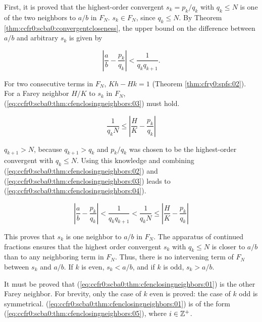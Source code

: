 \begin{vworktheoremproof}
First, it is proved that the highest-order
convergent $s_k = p_k/q_k$ with $q_k \leq N$ is one of the two
neighbors to $a/b$ in $F_N$.  $s_k \in F_N$, since $q_k \leq N$.
By Theorem \ref{thm:ccfr0:scba0:convergentcloseness}, the upper bound on the
difference between $a/b$ and arbitrary $s_k$ is given by

\begin{equation}
\label{eq:ccfr0:scba0:thm:cfenclosingneighbors:02}
\left| {\frac{a}{b}  - \frac{{p_k }}{{q_k }}} \right| < \frac{1}{{q_k q_{k + 1} }}.
\end{equation}

For two consecutive terms in $F_N$, $Kh-Hk=1$ 
(\cfryzeroxrefcomma{}Theorem \ref{thm:cfry0:spfs:02}).
For a Farey neighbor $H/K$ to $s_k$ in $F_N$, 
(\ref{eq:ccfr0:scba0:thm:cfenclosingneighbors:03}) must hold.

\begin{equation}
\label{eq:ccfr0:scba0:thm:cfenclosingneighbors:03}
\frac{1}{q_k N} \leq \left| {\frac{H}{K} - \frac{p_k}{q_k}} \right|
\end{equation}

$q_{k+1}>N$, because $q_{k+1}>q_k$ and $p_k/q_k$ was chosen to be the
highest-order convergent with $q_k\leq N$.  Using this knowledge and
combining (\ref{eq:ccfr0:scba0:thm:cfenclosingneighbors:02}) and 
(\ref{eq:ccfr0:scba0:thm:cfenclosingneighbors:03}) leads to
(\ref{eq:ccfr0:scba0:thm:cfenclosingneighbors:04}).

\begin{equation}
\label{eq:ccfr0:scba0:thm:cfenclosingneighbors:04}
\left| {\frac{a}{b}  - \frac{{p_k }}{{q_k }}} \right| < \frac{1}{{q_k q_{k + 1} }}
<
\frac{1}{q_k N} \leq \left| {\frac{H}{K} - \frac{p_k}{q_k}} \right|
\end{equation}

This proves that $s_k$ is one neighbor to $a/b$ in $F_N$.
The apparatus of continued fractions ensures that the
highest order convergent $s_k$ with $q_k\leq N$ is closer to $a/b$ than
to any neighboring term in $F_N$.  Thus, there is
no intervening term of $F_N$ between $s_k$ and $a/b$.
If $k$ is even, $s_k<a/b$, and if $k$ is
odd, $s_k>a/b$.

It must be proved that (\ref{eq:ccfr0:scba0:thm:cfenclosingneighbors:01}) is the other Farey
neighbor.  For brevity, only the case of $k$ even is proved:  the
case of $k$ odd is symmetrical.  (\ref{eq:ccfr0:scba0:thm:cfenclosingneighbors:01}) 
is of the form (\ref{eq:ccfr0:scba0:thm:cfenclosingneighbors:05}),
where $i \in {\mathbb{Z}^+}$.


\end{vworktheoremproof}
